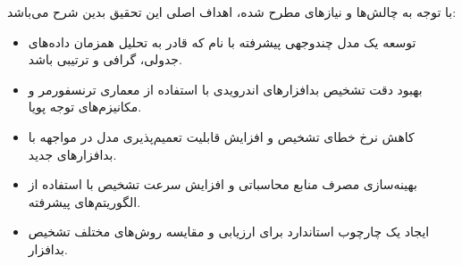 با توجه به چالش‌ها و نیازهای مطرح شده، اهداف اصلی این تحقیق بدین شرح می‌باشد:
\begin{itemize}
    \item توسعه یک مدل چندوجهی پیشرفته با نام  که قادر به تحلیل همزمان داده‌های جدولی، گرافی و ترتیبی باشد.
    \item بهبود دقت تشخیص بدافزارهای اندرویدی با استفاده از معماری ترنسفورمر و مکانیزم‌های توجه پویا.
    \item کاهش نرخ خطای تشخیص و افزایش قابلیت تعمیم‌پذیری مدل در مواجهه با بدافزارهای جدید.
    \item بهینه‌سازی مصرف منابع محاسباتی و افزایش سرعت تشخیص با استفاده از الگوریتم‌های پیشرفته.
    \item ایجاد یک چارچوب استاندارد برای ارزیابی و مقایسه روش‌های مختلف تشخیص بدافزار.
\end{itemize}

